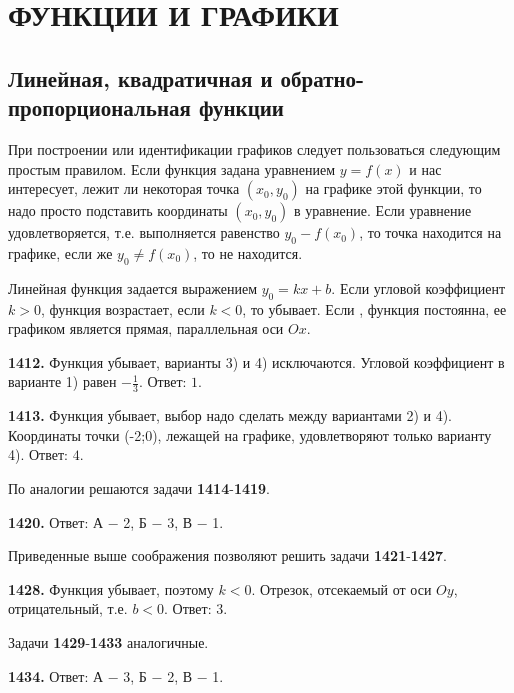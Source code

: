 \section{ФУНКЦИИ И ГРАФИКИ}
\subsection{Линейная, квадратичная и обратно- пропорциональная функции}


При построении или идентификации графиков следует пользоваться следующим простым правилом. Если  функция задана уравнением $y=f(x)$ и нас интересует, лежит ли некоторая точка $\left(x_0,y_0\right)$ на графике этой функции, то надо просто подставить координаты $\left(x_0,y_0\right)$ в уравнение. Если уравнение удовлетворяется, т.е. выполняется равенство $y_0-f(x_0)$, то точка находится на графике, если же $y_0\neq f(x_0)$, то не находится.

Линейная функция задается выражением $y_0=kx+b$. Если угловой коэффициент $k>0$, функция возрастает, если $k<0$, то убывает. Если , функция постоянна, ее графиком является прямая, параллельная оси $Ox$.

\textbf{1412.}  Функция убывает, варианты 3) и 4) исключаются. Угловой коэффициент в варианте 1) равен $-\frac{1}{3}$. \newline \null \hspace*{\fill} Ответ: $1$.   

\textbf{1413.}  Функция убывает, выбор надо сделать между вариантами 2) и 4). Координаты точки (-2;0), лежащей на графике, удовлетворяют только варианту 4). \newline \null \hspace*{\fill} Ответ: $4$. 

По аналогии решаются задачи \textbf{1414}-\textbf{1419}.

\textbf{1420.} \newline \null \hspace*{\fill} Ответ: А $-$ 2, Б $-$ 3, В $-$ 1.

Приведенные выше соображения позволяют решить задачи  \textbf{1421}-\textbf{1427}.

\textbf{1428.}  Функция убывает, поэтому $k<0$. Отрезок, отсекаемый от оси $Oy$, отрицательный, т.е. $b<0$. \newline \null \hspace*{\fill} Ответ: $3$. 

Задачи \textbf{1429}-\textbf{1433}  аналогичные.

\textbf{1434.}\newline \null \hspace*{\fill} Ответ: А $-$ 3, Б $-$ 2, В $-$ 1.

